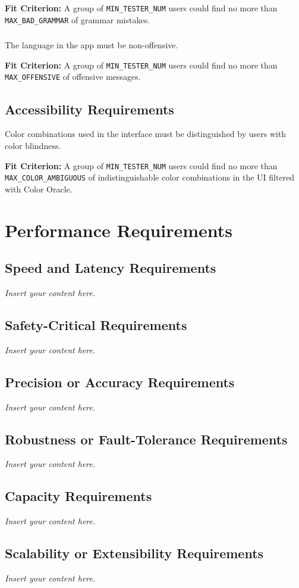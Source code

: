 \documentclass[12pt]{article}
\newcommand{\lips}{\textit{Insert your content here.}}
\begin{document}
\textbf{Fit Criterion:} A group of \texttt{MIN\_TESTER\_NUM}  users could find no more than \texttt{MAX\_BAD\_GRAMMAR} of grammar mistakes.

\subsubsection{}
The language in the app must be non-offensive.

\textbf{Fit Criterion:} A group of \texttt{MIN\_TESTER\_NUM} users could find no more than \texttt{MAX\_OFFENSIVE} of offensive messages.
\subsection{Accessibility Requirements}
Color combinations used in the interface must be distinguished by users with color blindness.

\textbf{Fit Criterion:} A group of \texttt{MIN\_TESTER\_NUM} users could find no more than \texttt{MAX\_COLOR\_AMBIGUOUS} of indistinguishable color combinations in the UI filtered with Color Oracle.

\section{Performance Requirements}
\subsection{Speed and Latency Requirements}
\lips
\subsection{Safety-Critical Requirements}
\lips
\subsection{Precision or Accuracy Requirements}
\lips
\subsection{Robustness or Fault-Tolerance Requirements}
\lips
\subsection{Capacity Requirements}
\lips
\subsection{Scalability or Extensibility Requirements}
\lips
\end{document}

